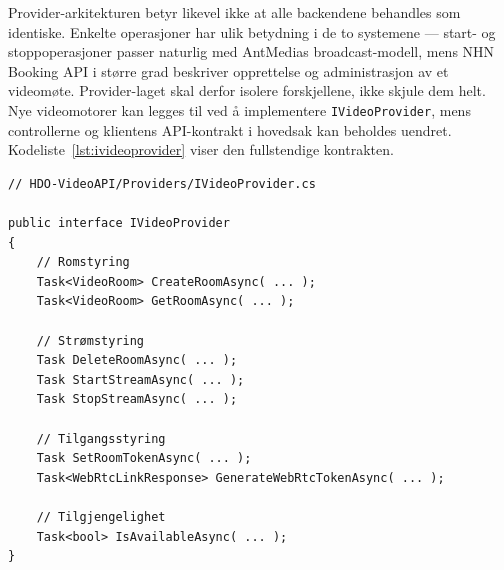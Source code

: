 Provider-arkitekturen betyr likevel ikke at alle backendene behandles som identiske. Enkelte operasjoner har ulik betydning i de to systemene --- start- og stoppoperasjoner passer naturlig med AntMedias broadcast-modell, mens NHN Booking API i større grad beskriver opprettelse og administrasjon av et videomøte. Provider-laget skal derfor isolere forskjellene, ikke skjule dem helt. Nye videomotorer kan legges til ved å implementere \texttt{IVideoProvider}, mens controllerne og klientens API-kontrakt i hovedsak kan beholdes uendret. Kodeliste~\ref{lst:ivideoprovider} viser den fullstendige kontrakten.
\begin{lstlisting}[language=CSharp, caption={Felles provider-kontrakt}, label={lst:ivideoprovider}]
// HDO-VideoAPI/Providers/IVideoProvider.cs

public interface IVideoProvider
{
    // Romstyring
    Task<VideoRoom> CreateRoomAsync( ... );
    Task<VideoRoom> GetRoomAsync( ... );

    // Strømstyring
    Task DeleteRoomAsync( ... );
    Task StartStreamAsync( ... );
    Task StopStreamAsync( ... );

    // Tilgangsstyring
    Task SetRoomTokenAsync( ... );
    Task<WebRtcLinkResponse> GenerateWebRtcTokenAsync( ... );

    // Tilgjengelighet
    Task<bool> IsAvailableAsync( ... );
}
\end{lstlisting}
